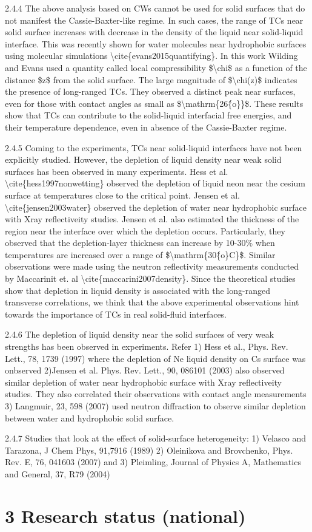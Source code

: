 \par 2.4.4 The above analysis based on CWs cannot be used for solid surfaces that do not manifest the Cassie-Baxter-like regime. In such cases, the range of TCs near solid surface increases with decrease in the density of the liquid near solid-liquid interface. This was recently shown for water molecules near hydrophobic surfaces using molecular simulations \textbackslash cite\{evans2015quantifying\}. In this work Wilding and Evans used a quantity called local compressibility \$\textbackslash chi\$ as a function of the distance \$z\$ from the solid surface. The large magnitude of \$\textbackslash chi(z)\$ indicates the presence of long-ranged TCs. They observed a distinct peak near surfaces, even for those with contact angles as small as \$\textbackslash mathrm\{26\^\{o\}\}\$. These results show that TCs can contribute to the solid-liquid interfacial free energies, and their temperature dependence, even in absence of the Cassie-Baxter regime.
\par 2.4.5 Coming to the experiments, TCs near solid-liquid interfaces have not been explicitly studied.  However, the depletion of liquid density near weak solid surfaces has been observed in many experiments. Hess et al. \textbackslash cite\{hess1997nonwetting\}  observed the depletion of liquid neon near the cesium surface at temperatures close to the critical point. Jensen et al. \textbackslash cite\{jensen2003water\} observed the depletion of water near hydrophobic surface with Xray reflectiveity studies. Jensen et al. also estimated the thickness of the region near the interface over which the depletion occurs. Particularly, they observed that the depletion-layer thickness can increase by 10-30\% when temperatures are increased over a range of \$\textbackslash mathrm\{30\^\{o\}C\}\$. Similar observations were made using the neutron reflectivity measurements conducted by Maccarinit et. al \textbackslash cite\{maccarini2007density\}. Since the theoretical studies show that depletion in liquid density is associated with the long-ranged transverse correlations, we think that the above experimental observations hint towards the importance of TCs in real solid-fluid interfaces.
\par 2.4.6 The depletion of liquid density near the solid surfaces of very weak strengths has been observed in experiments. Refer 1) Hess et al., Phys. Rev. Lett., 78, 1739 (1997) where the depletion of Ne liquid density on Cs surface was onbserved 2)Jensen et al. Phys. Rev. Lett., 90, 086101 (2003) also observed similar depletion of water near hydrophobic surface with Xray reflectiveity studies. They also correlated their observations with contact angle measurements 3) Langmuir, 23, 598 (2007) used neutron diffraction to observe similar depletion between water and hydrophobic solid surface.
\par 2.4.7 Studies that look at the effect of solid-surface heterogeneity: 1) Velasco and Tarazona, J Chem Phys, 91,7916 (1989) 2) Oleinikova and Brovchenko, Phys. Rev. E, 76, 041603 (2007) and 3) Pleimling, Journal of Physics A, Mathematics and General, 37, R79 (2004)\section{3 Research status (national)}
